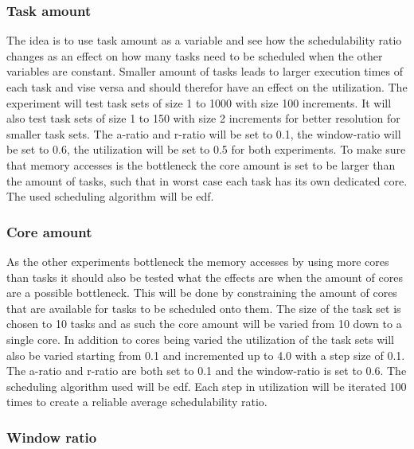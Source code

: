 \documentclass{kththesis}
\begin{document}
\subsubsection{Task amount}

The idea is to use task amount as a variable and see how the schedulability ratio changes as an
effect on how many tasks need to be scheduled when the other variables are constant. Smaller amount
of tasks leads to larger execution times of each task and vise versa and should therefor have an
effect on the utilization. The experiment will test task sets of size 1 to 1000 with size 100
increments. It will also test task sets of size 1 to 150 with size 2 increments for better
resolution for smaller task sets. The \acrshort{a}-ratio and \acrshort{r}-ratio will be set to 0.1,
the window-ratio will be set to 0.6, the utilization will be set to 0.5 for both experiments. To
make sure that memory accesses is the bottleneck the core amount is set to be larger than the amount
of tasks, such that in worst case each task has its own dedicated core. The used scheduling
algorithm will be \acrshort{edf}.

\subsubsection{Core amount}

As the other experiments bottleneck the memory accesses by using more cores than tasks it should
also be tested what the effects are when the amount of cores are a possible bottleneck. This will be
done by constraining the amount of cores that are available for tasks to be scheduled onto them. The
size of the task set is chosen to 10 tasks and as such the core amount will be varied from 10 down
to a single core. In addition to cores being varied the utilization of the task sets will also be
varied starting from 0.1 and incremented up to 4.0 with a step size of 0.1. The \acrshort{a}-ratio
and \acrshort{r}-ratio are both set to 0.1 and the window-ratio is set to 0.6. The scheduling
algorithm used will be \acrshort{edf}. Each step in utilization will be iterated 100 times to create
a reliable average schedulability ratio.


\subsubsection{Window ratio}
\end{document}
